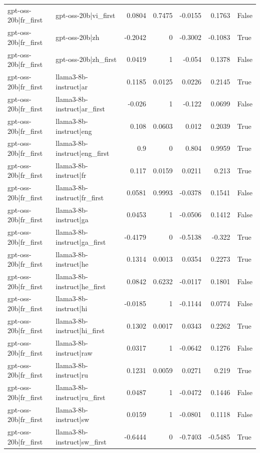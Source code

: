 \begin{table}
\begin{tabular}{l l r r r r l}
gpt-oss-20b|fr_first & gpt-oss-20b|vi_first & 0.0804 & 0.7475 & -0.0155 & 0.1763 & False \\
gpt-oss-20b|fr_first & gpt-oss-20b|zh & -0.2042 & 0 & -0.3002 & -0.1083 & True \\
gpt-oss-20b|fr_first & gpt-oss-20b|zh_first & 0.0419 & 1 & -0.054 & 0.1378 & False \\
gpt-oss-20b|fr_first & llama3-8b-instruct|ar & 0.1185 & 0.0125 & 0.0226 & 0.2145 & True \\
gpt-oss-20b|fr_first & llama3-8b-instruct|ar_first & -0.026 & 1 & -0.122 & 0.0699 & False \\
gpt-oss-20b|fr_first & llama3-8b-instruct|eng & 0.108 & 0.0603 & 0.012 & 0.2039 & True \\
gpt-oss-20b|fr_first & llama3-8b-instruct|eng_first & 0.9 & 0 & 0.804 & 0.9959 & True \\
gpt-oss-20b|fr_first & llama3-8b-instruct|fr & 0.117 & 0.0159 & 0.0211 & 0.213 & True \\
gpt-oss-20b|fr_first & llama3-8b-instruct|fr_first & 0.0581 & 0.9993 & -0.0378 & 0.1541 & False \\
gpt-oss-20b|fr_first & llama3-8b-instruct|ga & 0.0453 & 1 & -0.0506 & 0.1412 & False \\
gpt-oss-20b|fr_first & llama3-8b-instruct|ga_first & -0.4179 & 0 & -0.5138 & -0.322 & True \\
gpt-oss-20b|fr_first & llama3-8b-instruct|he & 0.1314 & 0.0013 & 0.0354 & 0.2273 & True \\
gpt-oss-20b|fr_first & llama3-8b-instruct|he_first & 0.0842 & 0.6232 & -0.0117 & 0.1801 & False \\
gpt-oss-20b|fr_first & llama3-8b-instruct|hi & -0.0185 & 1 & -0.1144 & 0.0774 & False \\
gpt-oss-20b|fr_first & llama3-8b-instruct|hi_first & 0.1302 & 0.0017 & 0.0343 & 0.2262 & True \\
gpt-oss-20b|fr_first & llama3-8b-instruct|raw & 0.0317 & 1 & -0.0642 & 0.1276 & False \\
gpt-oss-20b|fr_first & llama3-8b-instruct|ru & 0.1231 & 0.0059 & 0.0271 & 0.219 & True \\
gpt-oss-20b|fr_first & llama3-8b-instruct|ru_first & 0.0487 & 1 & -0.0472 & 0.1446 & False \\
gpt-oss-20b|fr_first & llama3-8b-instruct|sw & 0.0159 & 1 & -0.0801 & 0.1118 & False \\
gpt-oss-20b|fr_first & llama3-8b-instruct|sw_first & -0.6444 & 0 & -0.7403 & -0.5485 & True \\

\end{tabular}
\end{table}
